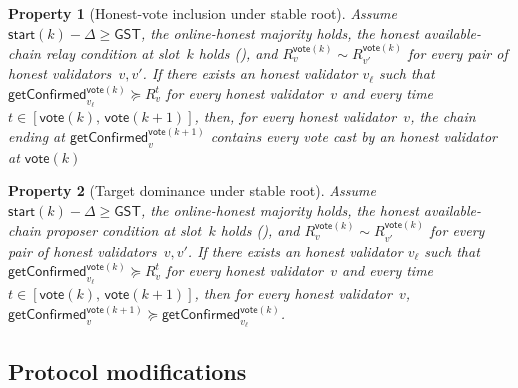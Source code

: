\documentclass{article}
\newcommand{\start}{\mathsf{start}}
\newcommand{\vote}{\mathsf{vote}}
\newcommand{\getConfirmed}{\textsf{getConfirmed}\xspace}
\theoremstyle{plain}
\newtheorem{property}{Property}
\theoremstyle{definition}
\theoremstyle{remark}
\newcommand{\GST}{\ensuremath{\mathsf{GST}}}
\newcommand{\OHM}{online-honest majority\xspace}
\newcommand{\HAP}{honest available-chain proposer\xspace}
\newcommand{\HAR}{honest available-chain relay\xspace}
\begin{document}
\begin{property}[Honest-vote inclusion under stable root]\label{rev:prop:honest-vote-inclusion}
Assume $\start(k) - \Delta \geq \GST$, the \OHM holds, the \HAR condition at slot~$k$ holds (), and $R_v^{\vote(k)} \sim R_{v'}^{\vote(k)}$ for every pair of honest validators~$v, v'$.
If there exists an honest validator $v_\ell$ such that
$\getConfirmed_{v_\ell}^{\vote(k)}\succeq R_{v}^t$ for every honest validator~$v$ and every time $t \in [\vote(k),\, \vote(k+1)]$, then,
for every honest validator~$v$, the chain ending at $\getConfirmed_v^{\vote(k+1)}$ contains every vote cast by an honest validator at $\vote(k)$
\end{property}


\begin{property}[Target dominance under stable root]\label{rev:prop:target-dominance}
Assume $\start(k) - \Delta \geq \GST$, the \OHM holds, the \HAP condition at slot~$k$ holds (), and $R_v^{\vote(k)} \sim R_{v'}^{\vote(k)}$ for every pair of honest validators~$v, v'$.
If there exists an honest validator $v_\ell$ such that $\getConfirmed_{v_\ell}^{\vote(k)} \succeq R_{v}^t$ for every honest validator~$v$ and every time $t \in [\vote(k),\, \vote(k+1)]$, then for every honest validator~$v$, $\getConfirmed_v^{\vote(k+1)} \succeq \getConfirmed_{v_\ell}^{\vote(k)}$.
\end{property}

\subsection{Protocol modifications}\label{rev:sec:healing-protocol}
\end{document}
